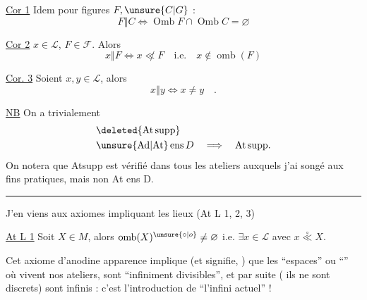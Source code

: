 
\uline{Cor 1} Idem pour figures $F,\unsure{C|G}$ :
\[
 F\mathrel{\Vert}C\Longleftrightarrow \operatorname{Omb}F\cap\operatorname{Omb}C=\varnothing
\]

\uline{Cor 2}  $x\in\mathcal{L}$, $F\in\mathscr{F}$. Alors
\[
 x\mathrel{\Vert}F\Longleftrightarrow x\not\ll F\quad\text{i.e.}\quad x\notin\operatorname{omb}(F)
\]

\uline{Cor. 3} Soient $x,y\in\mathcal{L}$, alors
\[
 x\mathrel{\Vert}y\Longleftrightarrow x\ne y\quad .
\]

\uline{NB} On a trivialement
\[
 \begin{aligned}
 &\deleted{\mathrm{At\,supp}}\\
 &\unsure{\mathrm{Ad}|\mathrm{At}}\,\mathrm{ens}\,D\quad\Longrightarrow\quad\mathrm{At\,supp}.
 \end{aligned}
\]
On notera que Atsupp est vérifié dans tous les ateliers auxquels j'ai songé aux fins pratiques, mais non At ens D.

\begin{center}\rule{.24\linewidth}{.4pt}\end{center}

J'en viens aux axiomes impliquant les lieux (At L 1, 2, 3)

\noindent\vrule\hspace{.5em}\begin{minipage}{.94\linewidth}
\uline{At L 1}  Soit $X\in M$, alors $\operatorname{omb}(X)^{\unsure{\circ|o}}\ne\varnothing$ i.e. $\exists x\in\mathcal{L}$ avec $x\mathrel{\overset{\circ}{\ll}}X$.
\end{minipage}

Cet axiome d'anodine apparence implique  (et signifie, ) que les ``espaces'' ou ``'' où vivent nos ateliers, sont ``infiniment divisibles'', et par suite ( ils ne sont discrets) sont infinis : c'est l'introduction de ``l'infini actuel''  !
